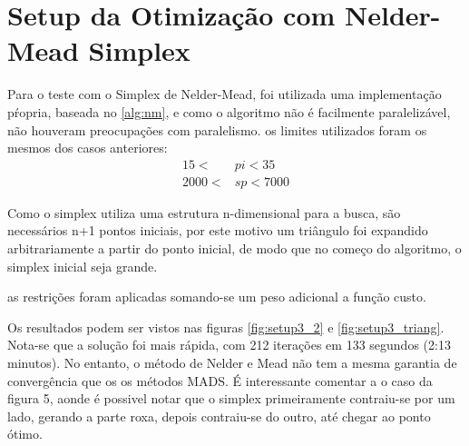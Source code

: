 \section{Setup da Otimização com Nelder-Mead Simplex}

Para o teste com o Simplex de Nelder-Mead, foi utilizada uma implementação pŕopria, baseada no \ref{alg:nm}, e como o algoritmo não é facilmente paralelizável, não houveram preocupações com paralelismo.
os limites utilizados foram os mesmos dos casos anteriores:
\begin{align}
15 < &pi < 35 \\
2000 < &sp < 7000
\end{align}

Como o simplex utiliza uma estrutura n-dimensional para a busca, são necessários n+1 pontos iniciais, por este motivo um triângulo foi expandido arbitrariamente a partir do ponto inicial, de modo que no começo do algoritmo, o simplex inicial seja grande. 

as restrições foram aplicadas somando-se um peso adicional a função custo.

Os resultados podem ser vistos nas figuras \ref{fig:setup3_2} e \ref{fig:setup3_triang}. Nota-se que a solução foi mais rápida, com 212 iterações em 133 segundos (2:13 minutos). No entanto, o método de Nelder e Mead não tem a mesma garantia de convergência que os os métodos MADS. É interessante comentar a o caso da figura 5, aonde é possivel notar que o simplex primeiramente contraiu-se por um lado, gerando a parte roxa, depois contraiu-se do outro, até chegar ao ponto ótimo.



